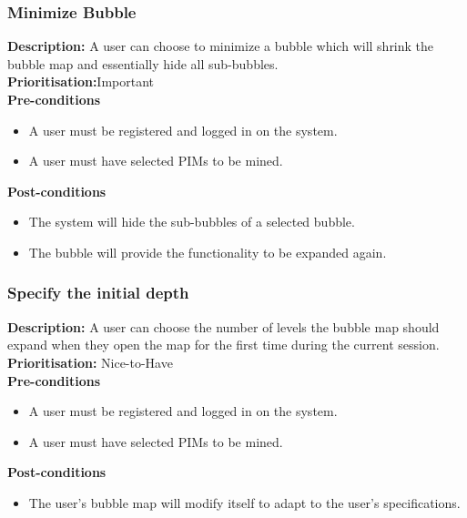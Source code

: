 \documentclass[hidelinks,english]{article}
\begin{document}
    		\subsubsection{Minimize Bubble}
				\textbf{Description:}  A user can choose to minimize a bubble which will shrink the bubble map and essentially hide all sub-bubbles.\\
    			\textbf{Prioritisation:}Important\\
    			\textbf{Pre-conditions}
			    \begin{itemize}
			        \item A user must be registered and logged in on the system.
			        \item A user must have selected PIMs to be mined.
			    \end{itemize}
			    \textbf{Post-conditions}
			     \begin{itemize}
			        \item The system will hide the sub-bubbles of a selected bubble.
			       \item The bubble will provide the functionality to be expanded again.
			    \end{itemize}
			    
    		\subsubsection{Specify the initial depth}
				\textbf{Description:}  A user can choose the number of levels the bubble map should expand when they open the map for the first time during the current session.\\
			    \textbf{Prioritisation:} Nice-to-Have\\
      			\textbf{Pre-conditions}
			    \begin{itemize}
			        \item A user must be registered and logged in on the system.
			        \item A user must have selected PIMs to be mined.
			    \end{itemize}
    			\textbf{Post-conditions}
     			\begin{itemize}
        			\item The user's bubble map will modify itself to adapt to the user's specifications.
    			\end{itemize}
    			
\end{document}
